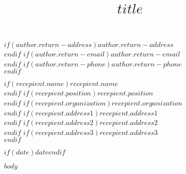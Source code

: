 \documentclass[$if(fontsize)$$fontsize$,$endif$]{article}
\title{$title$}
\date{}
\author{}
\theoremstyle{definition}
\theoremstyle{definition}
\theoremstyle{definition}
\theoremstyle{remark}
\begin{document}
\pagestyle{norm}

\raggedleft
$if(author.return-address)$$author.return-address$\\$endif$
$if(author.return-email)$$author.return-email$\\$endif$
$if(author.return-phone)$$author.return-phone$\\$endif$
\vspace{\baselineskip}

\raggedright
$if(recepient.name)$$recepient.name$\\$endif$
$if(recepient.position)$$recepient.position$\\$endif$
$if(recepient.organization)$$recepient.organization$\\$endif$
$if(recepient.address1)$$recepient.address1$\\$endif$
$if(recepient.address2)$$recepient.address2$\\$endif$
$if(recepient.address3)$$recepient.address3$\\$endif$
\vspace{\baselineskip}

\raggedleft
$if(date)$$date$$endif$

{\let\newpage\relax\maketitle}

\raggedright
$body$

\end{document}
